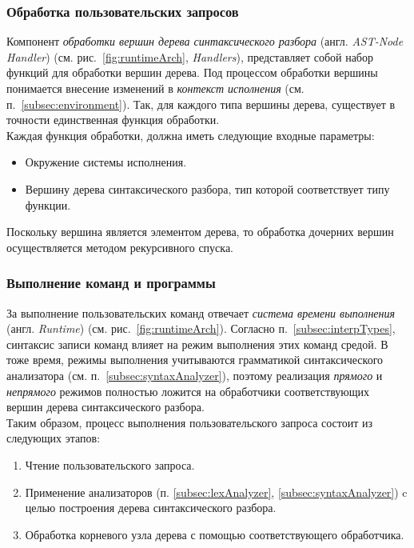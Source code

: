 \documentclass[12pt]{article}
\begin{document}
			\subsubsection{Обработка пользовательских запросов}
			\hspace{\parindent} Компонент {\it обработки вершин дерева синтаксического разбора} (англ. {\it AST-Node Handler}) (см. рис.~\ref{fig:runtimeArch}, {\it Handlers}), представляет собой набор функций для обработки вершин дерева. Под процессом обработки вершины понимается внесение изменений в {\it контекст исполнения} (см. п.~\ref{subsec:environment}). Так, для каждого типа вершины дерева, существует в точности единственная функция обработки. \\
			\indent Каждая функция обработки, должна иметь следующие входные параметры:
			\begin{itemize}
				\item Окружение системы исполнения.
				\item Вершину дерева синтаксического разбора, тип которой соответствует типу функции.
			\end{itemize}
			
			\indent Поскольку вершина является элементом дерева, то обработка дочерних вершин осуществляется методом рекурсивного спуска.

			\subsubsection{Выполнение команд и программы}
			\hspace{\parindent} За выполнение пользовательских команд отвечает {\it система времени выполнения} (англ. {\it Runtime}) (см. рис.~\ref{fig:runtimeArch}). Согласно п.~\ref{subsec:interpTypes}, синтаксис записи команд влияет на режим выполнения этих команд средой. В тоже время, режимы выполнения учитываются грамматикой синтаксического анализатора (см. п.~\ref{subsec:syntaxAnalyzer}), поэтому реализация {\it прямого} и {\it непрямого} режимов полностью ложится на обработчики соответствующих вершин дерева синтаксического разбора. \\   
			\indent Таким образом, процесс выполнения пользовательского запроса состоит из следующих этапов:
			\begin{enumerate}
				\item Чтение пользовательского запроса.
				\item Применение анализаторов (п. \ref{subsec:lexAnalyzer}, \ref{subsec:syntaxAnalyzer}) c целью построения дерева синтаксического разбора.
				\item Обработка корневого узла дерева с помощью соответствующего обработчика.
			\end{enumerate}
\end{document}
